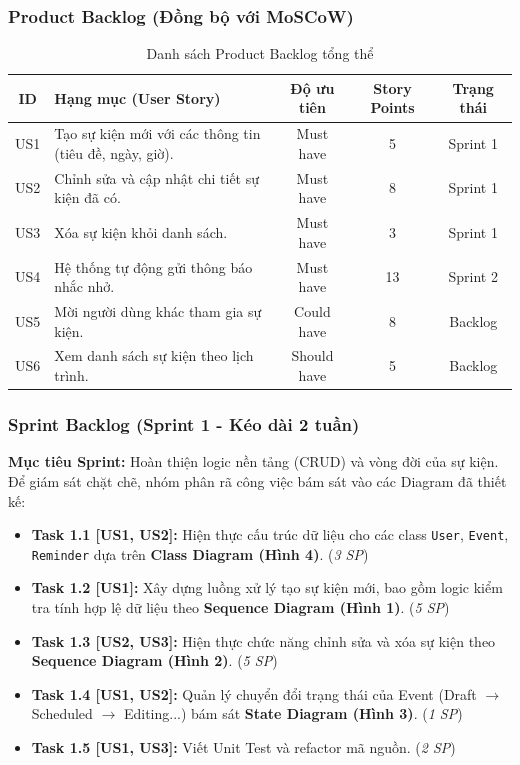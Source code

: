 \subsubsection*{Product Backlog (Đồng bộ với MoSCoW)}
\begin{table}[hbt!]
    \centering
    \renewcommand{\arraystretch}{1.3}
    \begin{tabularx}{\textwidth}{|c|X|c|c|c|}
        \hline
        \textbf{ID} & \textbf{Hạng mục (User Story)} & \textbf{Độ ưu tiên} & \textbf{Story Points} & \textbf{Trạng thái} \\ \hline
        US1 & Tạo sự kiện mới với các thông tin (tiêu đề, ngày, giờ). & Must have & 5 & Sprint 1 \\ \hline
        US2 & Chỉnh sửa và cập nhật chi tiết sự kiện đã có. & Must have & 8 & Sprint 1 \\ \hline
        US3 & Xóa sự kiện khỏi danh sách. & Must have & 3 & Sprint 1 \\ \hline
        US4 & Hệ thống tự động gửi thông báo nhắc nhở. & Must have & 13 & Sprint 2 \\ \hline
        US5 & Mời người dùng khác tham gia sự kiện. & Could have & 8 & Backlog \\ \hline
        US6 & Xem danh sách sự kiện theo lịch trình. & Should have & 5 & Backlog \\ \hline
    \end{tabularx}
    \caption{Danh sách Product Backlog tổng thể}
\end{table}

\subsubsection*{Sprint Backlog (Sprint 1 - Kéo dài 2 tuần)}
\textbf{Mục tiêu Sprint:} Hoàn thiện logic nền tảng (CRUD) và vòng đời của sự kiện.
Để giám sát chặt chẽ, nhóm phân rã công việc bám sát vào các Diagram đã thiết kế:
\begin{itemize}[leftmargin=*]
    \item \textbf{Task 1.1 [US1, US2]:} Hiện thực cấu trúc dữ liệu cho các class \texttt{User}, \texttt{Event}, \texttt{Reminder} dựa trên \textbf{Class Diagram (Hình 4)}. (\textit{3 SP})
    \item \textbf{Task 1.2 [US1]:} Xây dựng luồng xử lý tạo sự kiện mới, bao gồm logic kiểm tra tính hợp lệ dữ liệu theo \textbf{Sequence Diagram (Hình 1)}. (\textit{5 SP})
    \item \textbf{Task 1.3 [US2, US3]:} Hiện thực chức năng chỉnh sửa và xóa sự kiện theo \textbf{Sequence Diagram (Hình 2)}. (\textit{5 SP})
    \item \textbf{Task 1.4 [US1, US2]:} Quản lý chuyển đổi trạng thái của Event (Draft $\rightarrow$ Scheduled $\rightarrow$ Editing...) bám sát \textbf{State Diagram (Hình 3)}. (\textit{1 SP})
    \item \textbf{Task 1.5 [US1, US3]:} Viết Unit Test và refactor mã nguồn. (\textit{2 SP})
\end{itemize}

